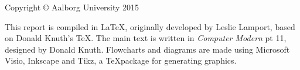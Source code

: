 {\small
\strut\vfill %
\noindent Copyright \copyright{} Aalborg University 2015\par
\vspace{0.2cm}

\noindent This report is compiled in \LaTeX, originally developed by Leslie Lamport, based on Donald Knuth's \TeX. The main text is written in \emph{Computer Modern} pt 11, designed by Donald Knuth. 
Flowcharts and diagrams are made using Microsoft Visio, Inkscape and Tikz, a \TeX package for generating graphics. }
\clearpage